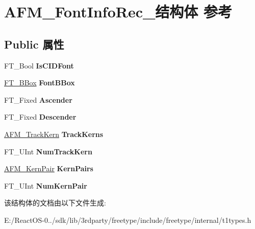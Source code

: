 \hypertarget{struct_a_f_m___font_info_rec__}{}\section{A\+F\+M\+\_\+\+Font\+Info\+Rec\+\_\+结构体 参考}
\label{struct_a_f_m___font_info_rec__}
\subsection*{Public 属性}
\begin{DoxyCompactItemize}
\item 
\mbox{\label{struct_a_f_m___font_info_rec___a6f198e74da5d8a3b7ff7518e255be231}} 
F\+T\+\_\+\+Bool {\bfseries Is\+C\+I\+D\+Font}
\item 
\mbox{\label{struct_a_f_m___font_info_rec___afa5112d6b0cc51839889206012dc1be6}} 
\hyperlink{struct_f_t___b_box__}{F\+T\+\_\+\+B\+Box} {\bfseries Font\+B\+Box}
\item 
\mbox{\label{struct_a_f_m___font_info_rec___a0b80412562435a2198a71aa4188ee85b}} 
F\+T\+\_\+\+Fixed {\bfseries Ascender}
\item 
\mbox{\label{struct_a_f_m___font_info_rec___a3561507200f0bc3413988af920924053}} 
F\+T\+\_\+\+Fixed {\bfseries Descender}
\item 
\mbox{\label{struct_a_f_m___font_info_rec___a8d9305229a1dacc15b8fceb5dbf25b9d}} 
\hyperlink{struct_a_f_m___track_kern_rec__}{A\+F\+M\+\_\+\+Track\+Kern} {\bfseries Track\+Kerns}
\item 
\mbox{\label{struct_a_f_m___font_info_rec___a9f7403b78d67694d7ee3bbe508ed7827}} 
F\+T\+\_\+\+U\+Int {\bfseries Num\+Track\+Kern}
\item 
\mbox{\label{struct_a_f_m___font_info_rec___a16c5da5249d4d4f68cc169469f3ee75a}} 
\hyperlink{struct_a_f_m___kern_pair_rec__}{A\+F\+M\+\_\+\+Kern\+Pair} {\bfseries Kern\+Pairs}
\item 
\mbox{\label{struct_a_f_m___font_info_rec___a7cd843bafa42fa62586c67d75ffbe85d}} 
F\+T\+\_\+\+U\+Int {\bfseries Num\+Kern\+Pair}
\end{DoxyCompactItemize}


该结构体的文档由以下文件生成\+:\begin{DoxyCompactItemize}
\item 
E\+:/\+React\+O\+S-\/0../sdk/lib/3rdparty/freetype/include/freetype/internal/t1types.\+h\end{DoxyCompactItemize}
